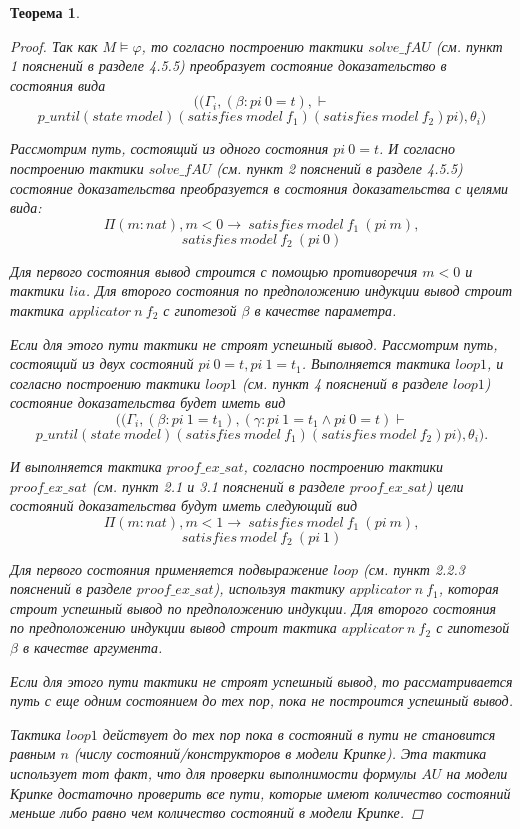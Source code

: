 \documentclass[12pt]{article}
\newtheorem{theorem}{Теорема}
\begin{document}
\begin{theorem}
\begin{proof}
Так как $M \models \varphi$, то
согласно построению тактики $solve\_fAU$ (см. пункт 1 пояснений в разделе 4.5.5) преобразует состояние доказательство в состояния вида
$$((\Gamma_i, (\beta: pi\ 0 = t), \vdash $$
    $$p\_until (state\ model) (satisfies\ model\ f_1) (satisfies\ model\ f_2) pi), \theta_i)$$

Рассмотрим путь, состоящий из одного состояния $pi\ 0 = t$. И согласно построению тактики $solve\_fAU$ (см. пункт 2 пояснений в разделе 4.5.5) состояние доказательства преобразуется в состояния доказательства с целями вида:
$$\Pi (m : nat), m < 0 \xrightarrow{}\ satisfies\ model\ f_1\ (pi\ m),$$
$$satisfies\ model\ f_2\ (pi\ 0)$$

Для первого состояния вывод строится с помощью противоречия $m<0$ и тактики $lia$. Для второго состояния по предположению индукции вывод строит тактика $applicator\ n\ f_2$ с гипотезой $\beta$ в качестве параметра.

Если для этого пути тактики не строят успешный вывод. Рассмотрим путь, состоящий из двух состояний $pi\ 0 = t, pi\ 1 = t_1$.
Выполняется тактика $loop1$, и согласно построению тактики $loop1$ (см. пункт 4 пояснений в разделе $loop1$)
состояние доказательства будет иметь вид
$$((\Gamma_i, (\beta: pi\ 1 = t_1),(\gamma: pi\ 1 = t_1  \wedge pi\ 0 = t) \vdash $$
    $$p\_until (state\ model) (satisfies\ model\ f_1) (satisfies\ model\ f_2) pi), \theta_i).$$

И выполняется тактика $proof\_ex\_sat$,
согласно построению тактики $proof\_ex\_sat$ (см. пункт 2.1 и 3.1 пояснений в разделе $proof\_ex\_sat$)
цели состояний доказательства будут иметь следующий вид
$$\Pi (m : nat), m < 1 \xrightarrow{}\ satisfies\ model\ f_1\ (pi\ m),$$
$$satisfies\ model\ f_2\ (pi\ 1)$$

Для первого состояния применяется подвыражение $loop$ (см. пункт 2.2.3 пояснений в разделе $proof\_ex\_sat$), используя тактику $applicator\ n\ f_1$, которая строит успешный вывод по предположению индукции. Для второго состояния по предположению индукции вывод строит тактика $applicator\ n\ f_2$ с гипотезой $\beta$ в качестве аргумента.

Если для этого пути тактики не строят успешный вывод, то рассматривается путь с еще одним состоянием до тех пор, пока не построится успешный вывод.

Тактика $loop1$ действует до тех пор пока в состояний в пути не становится равным $n$ (числу состояний/конструкторов в модели Крипке). Эта тактика использует тот факт, что для проверки выполнимости формулы $AU$ на модели Крипке достаточно проверить все пути, которые имеют количество состояний меньше либо равно чем количество состояний в модели Крипке\cite{Karpov}.


\end{proof}
\end{theorem}
\end{document}
